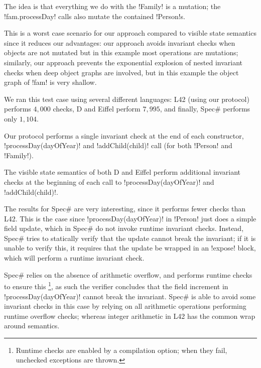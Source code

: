 The idea is that everything we do with the \Q!Family! is a mutation; the \Q!fam.processDay! calls also mutate the contained \Q!Person!s.

This is a worst case scenario for our approach compared to visible state semantics since it reduces our advantages:
our approach avoids invariant checks when objects are not mutated
but in this example most operations are mutations; 
similarly, our approach prevents the exponential explosion of nested invariant checks
when deep object graphs are involved, but in this example the object graph of \Q!fam! is very shallow.

We ran this test case using several different languages: L42 (using our protocol) performs $4{,}000$ checks, D and Eiffel perform $7{,}995$, and finally, Spec\# performs only $1{,}104$.

Our protocol performs a single invariant check at the end of each constructor,  \Q!processDay(dayOfYear)! and \Q!addChild(child)! call (for both \Q!Person! and \Q!Family!). 

The visible state semantics of both D and Eiffel perform additional invariant checks at the beginning of each call to \Q!processDay(dayOfYear)! and \Q!addChild(child)!.

The results for Spec\# are very interesting, since it performs fewer checks than L42.
This is the case since \Q!processDay(dayOfYear)! in \Q!Person! just does a simple field update, which in Spec\# do not invoke runtime invariant checks. Instead, Spec\# tries to statically verify that the update cannot break the invariant; if it is unable to verify this, it requires that the update be wrapped in an \Q!expose! block, which will perform a runtime invariant check. 

Spec\# relies on the absence of arithmetic overflow, and performs runtime checks to ensure this%
\footnote{%
Runtime checks are enabled by a compilation option; when they fail, unchecked exceptions are thrown.%
}, as such the verifier concludes that the field increment in \Q!processDay(dayOfYear)! cannot break the invariant.
Spec\# is able to avoid some invariant checks in this case 
by relying on all arithmetic operations performing runtime overflow checks;
whereas integer arithmetic in L42 has the common wrap around semantics.



